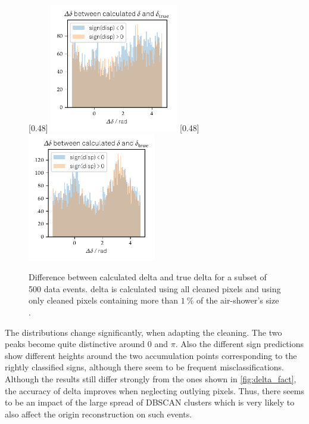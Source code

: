 \begin{figure}
  \subcaptionbox{\label{fig:delta_diff_a}}[0.48\textwidth]{
    \includegraphics[width=0.5\textwidth]{Plots/delta_delta/delta_true_diff_hist_thresholds_rad_20131104_162.pdf}
  }
  \subcaptionbox{\label{fig:delta_diff_perc}}[0.48\textwidth]{
    \includegraphics[width=0.5\textwidth]{Plots/delta_delta/delta_delta _DBSCAN_1perc_rad_20131104_162.pdf}
  }
  \caption{Difference between calculated delta and true delta for a subset of 500 data events. delta is calculated using all cleaned pixels \protect{} and using only cleaned pixels containing more than $\SI{1}{\percent}$ of the air-shower's size \protect{}.}
  \label{fig:true_delta}
\end{figure}
%
The distributions change significantly, when adapting the cleaning.
The two peaks become quite distinctive around $0$ and $\pi$. Also the
different sign predictions show different heights around the two
accumulation points corresponding to the rightly classified signs, although
there seem to be frequent misclassifications. Although the results still
differ strongly from the ones shown in \autoref{fig:delta_fact}, the
accuracy of delta improves when neglecting outlying pixels. Thus, there
seems to be an impact of the large spread of DBSCAN clusters which is very
likely to also affect the origin reconstruction on such events.

